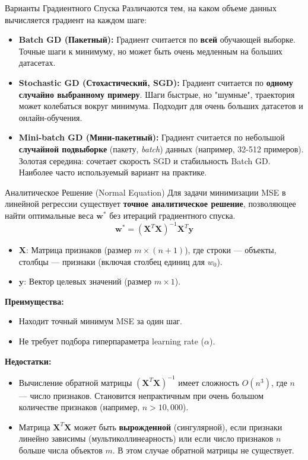 \begin{myexampleblock}{Варианты Градиентного Спуска}
    Различаются тем, на каком объеме данных вычисляется градиент на каждом шаге:
    \begin{itemize}[nosep, leftmargin=*, itemsep=0.5ex]
        \item \textbf{Batch GD (Пакетный):} Градиент считается по \textbf{всей} обучающей выборке. Точные шаги к минимуму, но может быть очень медленным на больших датасетах.
        \item \textbf{Stochastic GD (Стохастический, SGD):} Градиент считается по \textbf{одному случайно выбранному примеру}. Шаги быстрые, но "шумные", траектория может колебаться вокруг минимума. Подходит для очень больших датасетов и онлайн-обучения.
        \item \textbf{Mini-batch GD (Мини-пакетный):} Градиент считается по небольшой \textbf{случайной подвыборке} (пакету, \textit{batch}) данных (например, 32-512 примеров). Золотая середина: сочетает скорость SGD и стабильность Batch GD. Наиболее часто используемый вариант на практике.
    \end{itemize}
\end{myexampleblock}

\begin{textbox}{Аналитическое Решение (Normal Equation)}
    Для задачи минимизации MSE в линейной регрессии существует \textbf{точное аналитическое решение}, позволяющее найти оптимальные веса $\mathbf{w}^*$ без итераций градиентного спуска.
    \[
    \mathbf{w}^* = (\mathbf{X}^T \mathbf{X})^{-1} \mathbf{X}^T \mathbf{y}
    \]
    \begin{itemize}[nosep, leftmargin=*]
        \item $\mathbf{X}$: Матрица признаков (размер $m \times (n+1)$), где строки — объекты, столбцы — признаки (включая столбец единиц для $w_0$).
        \item $\mathbf{y}$: Вектор целевых значений (размер $m \times 1$).
    \end{itemize}
    \textbf{Преимущества:}
    \begin{itemize}[label=\textbullet, nosep, leftmargin=*]
         \item Находит точный минимум MSE за один шаг.
         \item Не требует подбора гиперпараметра learning rate ($\alpha$).
    \end{itemize}
    \textbf{Недостатки:}
    \begin{itemize}[label=\textbullet, nosep, leftmargin=*]
         \item Вычисление обратной матрицы $(\mathbf{X}^T \mathbf{X})^{-1}$ имеет сложность $O(n^3)$, где $n$ — число признаков. Становится непрактичным при очень большом количестве признаков (например, $n > 10,000$).
         \item Матрица $\mathbf{X}^T \mathbf{X}$ может быть \textbf{вырожденной} (сингулярной), если признаки линейно зависимы (мультиколлинеарность) или если число признаков $n$ больше числа объектов $m$. В этом случае обратной матрицы не существует.
    \end{itemize}
\end{textbox}

